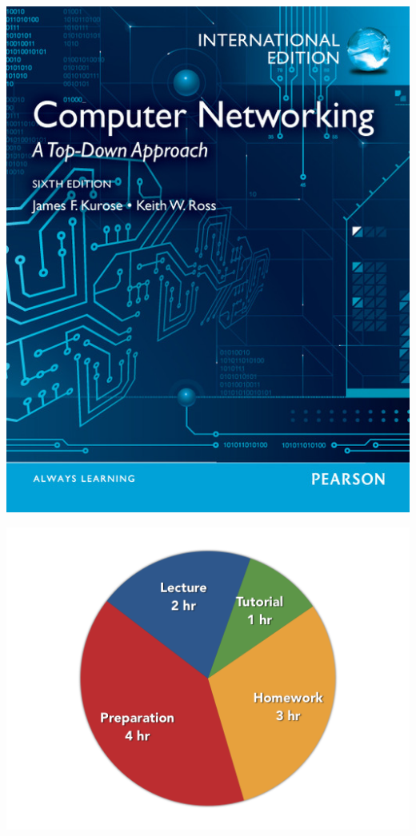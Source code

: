 \documentclass[20pt,handout,notes=show]{beamer}
\begin{document}
\begin{frame}
\begin{center}
	\includegraphics[scale=0.3]{figures/textbook-cover.jpg}
\end{center}
\end{frame}

\begin{frame}
\begin{center}
	\includegraphics[scale=0.3]{figures/workload-chart.png}
\end{center}
\end{frame}
\end{document}
